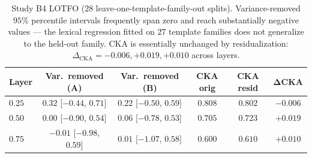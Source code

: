 \begin{table}[h]
\centering
\caption{Study B4 LOTFO ($28$ leave-one-template-family-out splits).
Variance-removed $95\%$ percentile intervals frequently span zero
and reach substantially negative values --- the lexical regression
fitted on $27$ template families does not generalize to the
held-out family. CKA is essentially unchanged by residualization:
$\Delta_\text{CKA} = -0.006, +0.019, +0.010$ across layers.}
\label{tab:study-b4-lotfo}
\begin{tabular}{l c c c c c}
\toprule
Layer & Var.\ removed (A) & Var.\ removed (B) & CKA orig & CKA resid & ΔCKA \\
\midrule
$0.25$ & $0.32$ [$-0.44$, $0.71$] & $0.22$ [$-0.50$, $0.59$] & $0.808$ & $0.802$ & $-0.006$ \\
$0.50$ & $0.00$ [$-0.90$, $0.54$] & $0.06$ [$-0.78$, $0.53$] & $0.705$ & $0.723$ & $+0.019$ \\
$0.75$ & $-0.01$ [$-0.98$, $0.59$] & $0.01$ [$-1.07$, $0.58$] & $0.600$ & $0.610$ & $+0.010$ \\
\bottomrule
\end{tabular}
\end{table}

